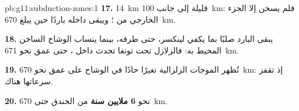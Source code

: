\begin{solution}{pb:g11:subduction-zones:1}
\textbf{17.} \qty{14}{km} قليلة إلى جانب \qty{100}{km}: فلم يسخن إلا الجزء الخارجي
من ؛ ويبقى داخله باردًا حين يبلغ
\qty{670}{km}.

\textbf{18.} يبقى  البارد صلبًا بما يكفي لينكسر، حتى طرفه،
بينما ينساب الوشاح الساخن المحيط به: فالزلازل تحت تونغا تحدث
داخل ، حتى عمق نحو \qty{671}{km}.

\textbf{19.} تُظهر الموجات الزلزالية تغيرًا حادًا في الوشاح على عمق نحو
\qty{670}{km}: إذ تقفز سرعاتها هناك.

\textbf{20.} نحو \textbf{6 ملايين سنة} من الخندق حتى
\qty{670}{km}.
\end{solution}
